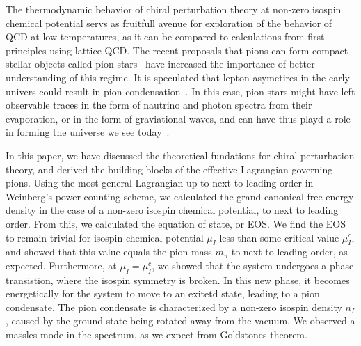 
The thermodynamic behavior of chiral perturbation theory at non-zero isospin chemical potential servs as fruitfull avenue for exploration of the behavior of QCD at low temperatures, as it can be compared to calculations from first principles using lattice QCD.
The recent proposals that pions can form compact stellar objects called pion stars~\cite{new_clas_of_compact_stars,andersen:bose_einstein} have increased the importance of better understanding of this regime.
It is speculated that lepton asymetires in the early univers could result in pion condensation~\cite{new_clas_of_compact_stars,abduki:Pion_condensation_in_a_dense_neutrino_gas,Wygas:Cosmic_QCD_Epoch_at_Nonvanishing_Lepton_Asymmetry,Schwarz_2009:Lepton_asymmetry_and_the_cosmic_QCD_transition}.
In this case, pion stars might have left observable traces in the form of nautrino and photon spectra from their evaporation, or in the form of graviational waves, and can have thus playd a role in forming the universe we see today~\cite{new_clas_of_compact_stars}.

In this paper, we have discussed the theoretical fundations for chiral perturbation theory, and derived the building blocks of the effective Lagrangian governing pions.
Using the most general Lagrangian up to next-to-leading order in Weinberg's power counting scheme, we calculated the grand canonical free energy density in the case of a non-zero isospin chemical potential, to next to leading order.
From this, we calculated the equation of state, or EOS.
We find the EOS to remain trivial for isospin chemical potential $\mu_I$ less than some critical value $\mu_I^c$, and showed that this value equals the pion mass $m_\pi$ to next-to-leading order, as expected.
Furthermore, at $\mu_I = \mu_I^c$, we showed that the system undergoes a phase transistion, where the isospin symmetry is broken.
In this new phase, it becomes energetically for the system to move to an exitetd state, leading to a pion condensate.
The pion condensate is characterized by a non-zero isospin density $n_I$, caused by the ground state being rotated away from the vacuum.
We observed a massles mode in the spectrum, as we expect from Goldstones theorem.


